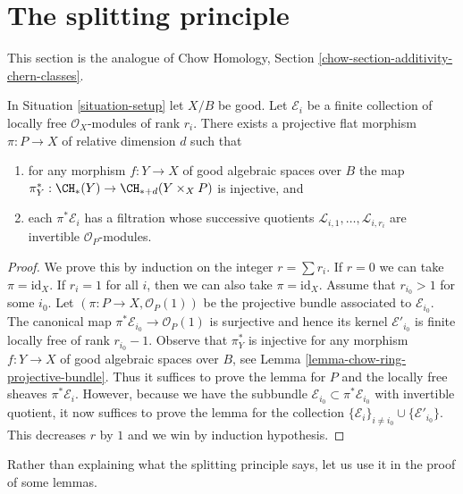 \section{The splitting principle}
\label{section-splitting-principle}

\noindent
This section is the analogue of Chow Homology, Section
\ref{chow-section-additivity-chern-classes}.

\begin{lemma}
\label{lemma-splitting-principle}
In Situation \ref{situation-setup} let $X/B$ be good.
Let $\mathcal{E}_i$ be a finite collection of locally free
$\mathcal{O}_X$-modules of rank $r_i$. There exists a projective
flat morphism $\pi : P \to X$ of relative dimension $d$ such that
\begin{enumerate}
\item for any morphism $f : Y \to X$ of good algebraic spaces
over $B$ the map
$\pi_Y^* : \CH_*(Y) \to \CH_{* + d}(Y \times_X P)$ is injective, and
\item each $\pi^*\mathcal{E}_i$ has a filtration
whose successive quotients $\mathcal{L}_{i, 1}, \ldots, \mathcal{L}_{i, r_i}$
are invertible ${\mathcal O}_P$-modules.
\end{enumerate}
\end{lemma}

\begin{proof}
We prove this by induction on the integer $r = \sum r_i$.
If $r = 0$ we can take $\pi = \text{id}_X$.
If $r_i = 1$ for all $i$, then we can also take $\pi = \text{id}_X$.
Assume that $r_{i_0} > 1$ for some $i_0$.
Let $(\pi : P \to X, \mathcal{O}_P(1))$
be the projective bundle associated to $\mathcal{E}_{i_0}$.
The canonical map $\pi^*\mathcal{E}_{i_0} \to \mathcal{O}_P(1)$
is surjective and hence its kernel $\mathcal{E}'_{i_0}$
is finite locally free of rank $r_{i_0} - 1$.
Observe that $\pi_Y^*$ is injective for any
morphism $f : Y \to X$ of good algebraic spaces
over $B$, see Lemma \ref{lemma-chow-ring-projective-bundle}.
Thus it suffices to prove the lemma for
$P$ and the locally free sheaves $\pi^*\mathcal{E}_i$.
However, because we have the subbundle
$\mathcal{E}_{i_0} \subset \pi^*\mathcal{E}_{i_0}$
with invertible quotient, it now suffices to prove
the lemma for the collection
$\{\mathcal{E}_i\}_{i \not = i_0} \cup \{\mathcal{E}'_{i_0}\}$.
This decreases $r$ by $1$ and we win by induction hypothesis.
\end{proof}

\noindent
Rather than explaining what the splitting principle says, let
us use it in the proof of some lemmas.


